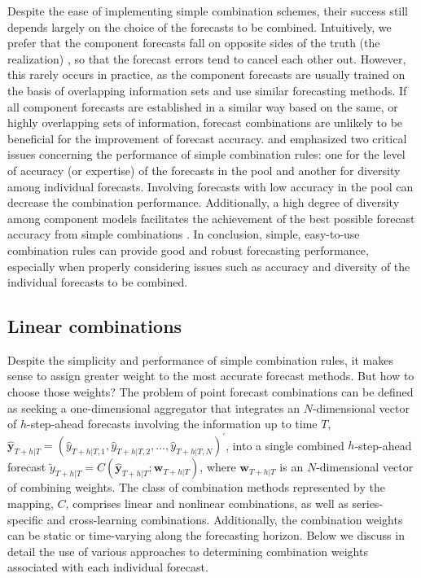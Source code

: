\documentclass[a4paper,11pt]{article}
\begin{document}
Despite the ease of implementing simple combination schemes, their success still depends largely on the choice of the forecasts to be combined. Intuitively, we prefer that the component forecasts fall on opposite sides of the truth (the realization) \citep{Bates1969-yj,Larrick2006-sr}, so that the forecast errors tend to cancel each other out. However, this rarely occurs in practice, as the component forecasts are usually trained on the basis of overlapping information sets and use similar forecasting methods. If all component forecasts are established in a similar way based on the same, or highly overlapping sets of information, forecast combinations are unlikely to be beneficial for the improvement of forecast accuracy. \citet{Mannes2014-dl} and \citet{Lichtendahl2020-ut} emphasized two critical issues concerning the performance of simple combination rules: one for the level of accuracy (or expertise) of the forecasts in the pool and another for diversity among individual forecasts. Involving forecasts with low accuracy in the pool can decrease the combination performance. Additionally, a high degree of diversity among component models facilitates the achievement of the best possible forecast accuracy from simple combinations \citep{Thomson2019-al}. In conclusion, simple, easy-to-use combination rules can provide good and robust forecasting performance, especially when properly considering issues such as accuracy and diversity of the individual forecasts to be combined.

\subsection{Linear combinations}
\label{sec:linear_comb}

Despite the simplicity and performance of simple combination rules, it makes sense to assign greater weight to the most accurate forecast methods. But how to choose those weights? The problem of point forecast combinations can be defined as seeking a one-dimensional aggregator that integrates an $N$-dimensional vector of $h$-step-ahead forecasts involving the information up to time $T$, $\hat{\bm{y}}_{T+h|T}=\left(\hat{y}_{T+h|T, 1}, \hat{y}_{T+h|T, 2}, \dots, \hat{y}_{T+h|T, N}\right)^{\prime}$, into a single combined $h$-step-ahead forecast $\tilde{y}_{T+h|T}=C\left(\hat{\bm{y}}_{T+h|T} ; \bm{w}_{T+h|T}\right)$, where $\bm{w}_{T+h|T}$ is an $N$-dimensional vector of combining weights. The class of combination methods represented by the mapping, $C$, comprises linear and nonlinear combinations, as well as series-specific and cross-learning combinations. Additionally, the combination weights can be static or time-varying along the forecasting horizon. Below we discuss in detail the use of various approaches to determining combination weights associated with each individual forecast.
\end{document}
